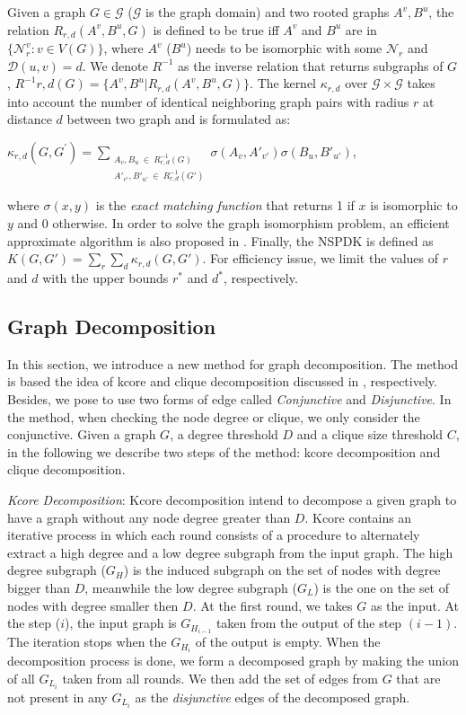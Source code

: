 \documentclass{esannV2}
\begin{document}
Given a graph $G \in \mathcal{G}$ ($\mathcal{G}$ is the graph domain) and two rooted graphs $A^v, B^u$, the relation $R_{r,d}(A^v, B^u, G)$ is defined to be true iff $A^v$ and $B^u$ are in $\lbrace \mathcal{N}_r^v: v \in V(G) \rbrace$, where $A^v$ ($B^u$) needs to be isomorphic with some $\mathcal{N}_r$ and $\mathcal{D}(u,v)= d$. We denote $R^{-1}$ as the inverse relation that returns subgraphs of $G$, $R^{-1}{r,d}(G) = \lbrace A^v, B^u | R_{r,d}(A^v,B^u,G)\rbrace$. The kernel $\kappa_{r,d}$ over $\mathcal{G} \times \mathcal{G}$ takes into account the number of identical neighboring graph pairs with radius $r$ at distance $d$ between two graph and is formulated as:
\begin{center}
 $\kappa_{r,d}(G,G^{'}) = \sum\limits_{\substack{A_v, B_u \ \in \ R_{r,d}^{-1}(G) \\ {A'}_{v'}, {B'}_{u'} \ \in \ R_{r,d}^{-1}(G') }} { \sigma(A_v,A'_{v'})\sigma(B_u,B'_{u'}) }$,
\end{center}
where $\sigma(x,y)$ is the \textit{exact matching function} that returns 1 if $x$ is isomorphic to $y$ and 0 otherwise. In order to solve the graph isomorphism problem, an efficient approximate algorithm is also proposed in \cite{nspdk}. Finally, the NSPDK is defined as $K(G,G') = \sum\limits_{r}{\sum\limits_{d}{\kappa_{r,d}(G,G')}}$. For efficiency issue, we limit the values of $r$ and $d$ with the upper bounds $r^*$ and $d^*$, respectively.
\subsection{Graph Decomposition}
In this section, we introduce a new method for graph decomposition. The method is based the idea of kcore and clique decomposition discussed in \cite{kcore}, \cite{clique} respectively. Besides, we pose to use two forms of edge called \textit{Conjunctive} and \textit{Disjunctive}. In the method, when checking the node degree or clique, we only consider the conjunctive. Given a graph $G$, a degree threshold $D$ and a clique size threshold $C$, in the following we describe two steps of the method: kcore decomposition and clique decomposition.

\textit{Kcore Decomposition}: Kcore decomposition intend to decompose a given graph to have a graph without any node degree greater than $D$. Kcore contains an iterative process in which each round consists of a procedure to alternately extract a high degree and a low degree subgraph from the input graph. The high degree subgraph ($G_H$) is the induced subgraph on the set of nodes with degree bigger than $D$, meanwhile the low degree subgraph ($G_L$) is the one on the set of nodes with degree smaller then $D$. At the first round, we takes $G$ as the input. At the step ($i$), the input graph is $G_{H_{i-1}}$ taken from the output 
of the step $(i-1)$. The iteration stops when the $G_{H_{i}}$ of the output is empty. When the decomposition process is done, we form a decomposed graph by making the union of all $G_{L_{i}}$ taken from all rounds. We then add the set of edges from $G$ that are not present in any $G_{L_{i}}$ as the \textit{disjunctive} edges of the decomposed graph. 
\end{document}

